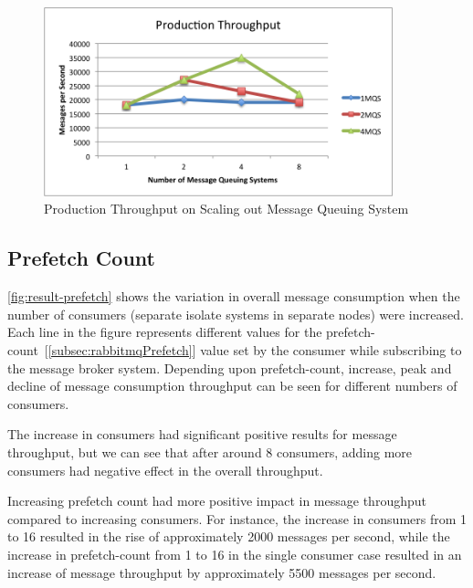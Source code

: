 \begin{figure}[H]
  \centering  \includegraphics[width=0.9\textwidth]{figures/05productionRabbit}
  \caption[Production Throughput on Scaling out Message Queuing System]{Production Throughput on Scaling out Message Queuing System}
  \label{fig:result-productionRabbit}
\end{figure}

\subsection{Prefetch Count}
\label{subsec:prefetchCount}
\autoref{fig:result-prefetch} shows the variation in overall message consumption when the number of consumers (separate isolate systems in separate nodes) were increased. Each line in the figure represents different values for the prefetch-count~[\autoref{subsec:rabbitmqPrefetch}] value set by the consumer while subscribing to the message broker system. Depending upon prefetch-count, increase, peak and decline of message consumption throughput can be seen for different numbers of consumers.

  The increase in consumers had significant positive results for message throughput, but we can see that after around 8 consumers, adding more consumers had negative effect in the overall throughput.

    Increasing prefetch count had more positive impact in message throughput compared to increasing consumers. For instance, the increase in consumers from 1 to 16 resulted in the rise of approximately 2000 messages per second, while the increase in prefetch-count from 1 to 16 in the single consumer case resulted in an increase of message throughput by approximately 5500 messages per second.

